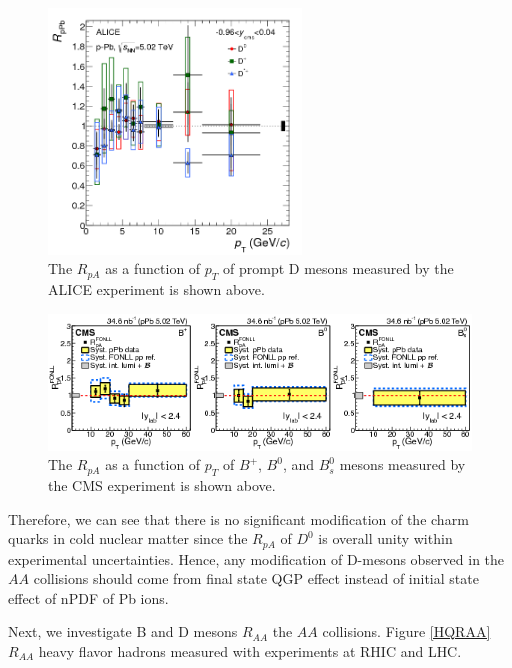 \begin{figure}[hbtp]
\begin{center}
\includegraphics[width=0.60\textwidth]{Figures/Chapter2/ALICEDRpA.png}
\caption{The $R_{pA}$ as a function of $p_T$ of prompt D mesons measured by the ALICE experiment is shown above.}
\label{DRPA}
\end{center}
\end{figure}   

\begin{figure}[hbtp]
\begin{center}
\includegraphics[width=1.10\textwidth]{Figures/Chapter2/CMSDRpA.png}
\caption{The $R_{pA}$ as a function of $p_T$ of $B^+$, $B^0$, and $B^0_s$ mesons measured by the CMS experiment is shown above.}
\label{BRPA}
\end{center}
\end{figure}   

Therefore, we can see that there is no significant modification of the charm quarks in cold nuclear matter since the $R_{pA}$ of $D^0$ is overall unity within experimental uncertainties. Hence, any modification of D-mesons observed in the $AA$ collisions should come from final state QGP effect instead of initial state effect of nPDF of Pb ions. 

Next, we investigate B and D mesons $R_{AA}$ the $AA$ collisions. Figure \ref{HQRAA} $R_{AA}$ heavy flavor hadrons measured with experiments at RHIC and LHC.

